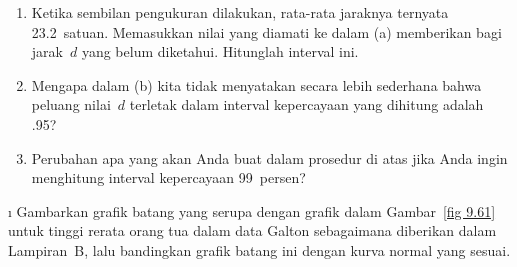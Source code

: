 \begin{LJSItem}
\begin{enumerate}
\item  Ketika sembilan pengukuran dilakukan, rata-rata jaraknya ternyata 23.2~satuan.
Memasukkan nilai yang diamati ke dalam (a) memberikan 
bagi jarak~$d$ yang belum diketahui.  Hitunglah interval ini.

\item  Mengapa dalam (b) kita tidak menyatakan secara lebih sederhana bahwa peluang nilai~$d$
terletak dalam interval kepercayaan yang dihitung adalah .95?

\item  Perubahan apa yang akan Anda buat dalam prosedur di atas jika Anda ingin menghitung
interval kepercayaan 99~persen?
\end{enumerate}

\i\label{exer 9.4.14}  Gambarkan grafik batang yang serupa dengan grafik dalam
Gambar~\ref{fig 9.61} untuk tinggi rerata orang tua dalam data Galton sebagaimana diberikan dalam
Lampiran~B, lalu bandingkan grafik batang ini dengan kurva normal yang sesuai.

\end{LJSItem}
%
